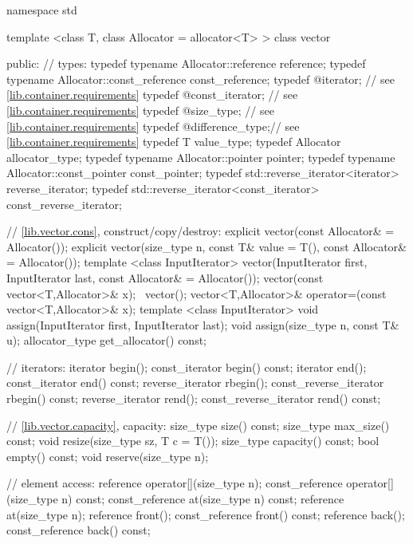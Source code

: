 \begin{codeblock}
namespace std {
  template <class T, class Allocator = allocator<T> >
  class vector {
  public:
    // types:
    typedef typename Allocator::reference         reference;
    typedef typename Allocator::const_reference   const_reference;
    typedef @\impdef@                iterator;       // see \ref{lib.container.requirements}
    typedef @\impdef@                const_iterator; // see \ref{lib.container.requirements}
    typedef @\impdef@                size_type;      // see \ref{lib.container.requirements}
    typedef @\impdef@                difference_type;// see \ref{lib.container.requirements}
    typedef T                                     value_type;
    typedef Allocator                             allocator_type;
    typedef typename Allocator::pointer           pointer;
    typedef typename Allocator::const_pointer     const_pointer;
    typedef std::reverse_iterator<iterator>       reverse_iterator;
    typedef std::reverse_iterator<const_iterator> const_reverse_iterator;

    // \ref{lib.vector.cons}, construct/copy/destroy:
    explicit vector(const Allocator& = Allocator());
    explicit vector(size_type n, const T& value = T(),
        const Allocator& = Allocator());
    template <class InputIterator>
      vector(InputIterator first, InputIterator last,
        const Allocator& = Allocator());
    vector(const vector<T,Allocator>& x);
   ~vector();
    vector<T,Allocator>& operator=(const vector<T,Allocator>& x);
    template <class InputIterator>
      void assign(InputIterator first, InputIterator last);
    void assign(size_type n, const T& u);
    allocator_type get_allocator() const;

    // iterators:
    iterator               begin();
    const_iterator         begin() const;
    iterator               end();
    const_iterator         end() const;
    reverse_iterator       rbegin();
    const_reverse_iterator rbegin() const;
    reverse_iterator       rend();
    const_reverse_iterator rend() const;

    // \ref{lib.vector.capacity}, capacity:
    size_type size() const;
    size_type max_size() const;
    void      resize(size_type sz, T c = T());
    size_type capacity() const;
    bool      empty() const;
    void      reserve(size_type n);

    // element access:
    reference       operator[](size_type n);
    const_reference operator[](size_type n) const;
    const_reference at(size_type n) const;
    reference       at(size_type n);
    reference       front();
    const_reference front() const;
    reference       back();
    const_reference back() const;

}}
\end{codeblock}
